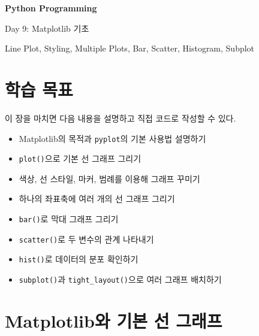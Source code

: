 \documentclass[11pt,a4paper]{article}
\begin{document}
\begin{titlepage}
    \centering
    \vspace*{3cm}

    {\Huge\bfseries Python Programming\par}
    \vspace{0.8cm}
    {\LARGE Day 9: Matplotlib 기초\par}

    \vspace{2cm}

    {\large Line Plot, Styling, Multiple Plots, Bar, Scatter, Histogram, Subplot\par}

    \vfill
\end{titlepage}

\tableofcontents
\newpage

\section{학습 목표}

\begin{learningbox}
이 장을 마치면 다음 내용을 설명하고 직접 코드로 작성할 수 있다.
\begin{itemize}[leftmargin=1.5em]
    \item Matplotlib의 목적과 \texttt{pyplot}의 기본 사용법 설명하기
    \item \texttt{plot()}으로 기본 선 그래프 그리기
    \item 색상, 선 스타일, 마커, 범례를 이용해 그래프 꾸미기
    \item 하나의 좌표축에 여러 개의 선 그래프 그리기
    \item \texttt{bar()}로 막대 그래프 그리기
    \item \texttt{scatter()}로 두 변수의 관계 나타내기
    \item \texttt{hist()}로 데이터의 분포 확인하기
    \item \texttt{subplot()}과 \texttt{tight\_layout()}으로 여러 그래프 배치하기
\end{itemize}
\end{learningbox}

\section{Matplotlib와 기본 선 그래프}
\end{document}
